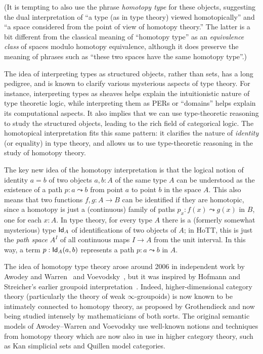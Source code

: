 (It is tempting to also use the phrase \emph{homotopy type} for these objects, suggesting the dual interpretation of ``a type (as in type theory) viewed homotopically'' and ``a space considered from the point of view of homotopy theory.''
The latter is a bit different from the classical meaning of ``homotopy type'' as an \emph{equivalence class} of spaces modulo homotopy equivalence, although it does preserve the meaning of phrases such as ``these two spaces have the same homotopy type''.)

The idea of interpreting types as structured objects, rather than sets, has a long pedigree, and is known to clarify various mysterious aspects of type theory.
For instance, interpreting types as sheaves helps explain the intuitionistic nature of type theoretic logic, while interpreting them as PERs or ``domains'' helps explain its computational aspects.
It also implies that we can use type-theoretic reasoning to study the structured objects, leading to the rich field of categorical logic.
The homotopical interpretation fits this same pattern: it clarifies the nature of \emph{identity} (or equality) in type theory, and allows us to use type-theoretic reasoning in the study of homotopy theory.

The key new idea of the homotopy interpretation is that the logical notion of identity $a = b$ of two objects $a, b: A$ of the same type $A$ can be understood as the existence of a path $p : a \leadsto b$ from point $a$ to point $b$ in the space $A$.
This also means that two functions $f, g: A\to B$ can be identified if they are homotopic, since a homotopy is just a (continuous) family of paths $p_x: f(x) \leadsto g(x)$ in $B$, one for each $x:A$.
In type theory, for every type $A$ there is a (formerly somewhat mysterious) type $\idtypevar{A}$ of identifications of two objects of $A$; in HoTT, this is just the \emph{path space} $A^I$ of all continuous maps $I\to A$ from the unit interval.
In this way, a term $p : \idtype[A]{a}{b}$ represents a path $p : a \leadsto b$ in $A$. 

The idea of homotopy type theory arose around 2006 in independent work by Awodey and Warren~\cite{AW} and Voevodsky~\cite{VV}, but it was inspired by 
Hofmann and Streicher's earlier groupoid interpretation~\cite{HofmannM:gromtt}.
Indeed, higher-dimensional category theory (particularly the theory of weak $\infty$-groupoids) is now known to be intimately connected to homotopy theory, as proposed by Grothendieck and now being studied intensely by mathematicians of both sorts.
The original semantic models of Awodey--Warren and Voevodsky use well-known notions and techniques from homotopy theory which are now also in use in higher category theory, such as Kan simplicial sets and Quillen model categories.


